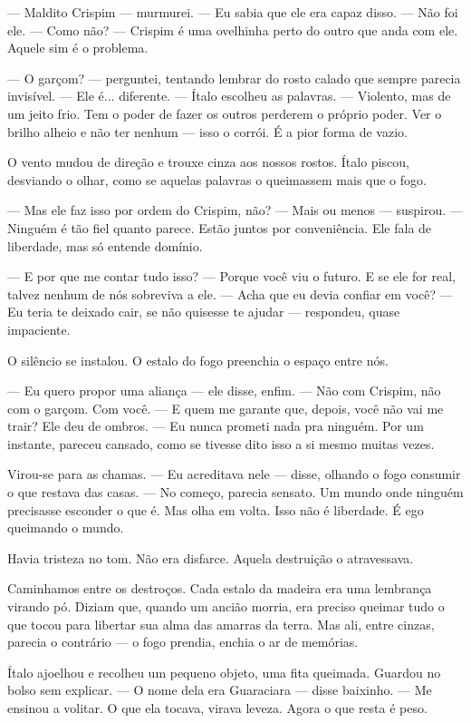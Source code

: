 — Maldito Crispim — murmurei. — Eu sabia que ele era capaz disso.  
— Não foi ele.  
— Como não?  
— Crispim é uma ovelhinha perto do outro que anda com ele.  
Aquele sim é o problema.

— O garçom? — perguntei, tentando lembrar do rosto calado que sempre parecia invisível.  
— Ele é... diferente. — Ítalo escolheu as palavras. — Violento, mas de um jeito frio.  
Tem o poder de fazer os outros perderem o próprio poder.  
Ver o brilho alheio e não ter nenhum — isso o corrói.  
É a pior forma de vazio.

O vento mudou de direção e trouxe cinza aos nossos rostos.  
Ítalo piscou, desviando o olhar, como se aquelas palavras o queimassem mais que o fogo.

— Mas ele faz isso por ordem do Crispim, não?  
— Mais ou menos — suspirou. — Ninguém é tão fiel quanto parece.
Estão juntos por conveniência. Ele fala de liberdade, mas só entende domínio.

— E por que me contar tudo isso?  
— Porque você viu o futuro. E se ele for real, talvez nenhum de nós sobreviva a ele.  
— Acha que eu devia confiar em você?  
— Eu teria te deixado cair, se não quisesse te ajudar — respondeu, quase impaciente.  

O silêncio se instalou.  
O estalo do fogo preenchia o espaço entre nós.

— Eu quero propor uma aliança — ele disse, enfim. — Não com Crispim, não com o garçom. Com você.  
— E quem me garante que, depois, você não vai me trair?  
Ele deu de ombros.  
— Eu nunca prometi nada pra ninguém.  
Por um instante, pareceu cansado, como se tivesse dito isso a si mesmo muitas vezes.

Virou-se para as chamas.  
— Eu acreditava nele — disse, olhando o fogo consumir o que restava das casas. — No começo, parecia sensato. Um mundo onde ninguém precisasse esconder o que é.  
Mas olha em volta. Isso não é liberdade. É ego queimando o mundo.

Havia tristeza no tom.  
Não era disfarce.  
Aquela destruição o atravessava.

Caminhamos entre os destroços.  
Cada estalo da madeira era uma lembrança virando pó.  
Diziam que, quando um ancião morria, era preciso queimar tudo o que tocou para libertar sua alma das amarras da terra.  
Mas ali, entre cinzas, parecia o contrário — o fogo prendia, enchia o ar de memórias.

Ítalo ajoelhou e recolheu um pequeno objeto, uma fita queimada.  
Guardou no bolso sem explicar.  
— O nome dela era Guaraciara — disse baixinho. — Me ensinou a volitar.
O que ela tocava, virava leveza.  
Agora o que resta é peso.

